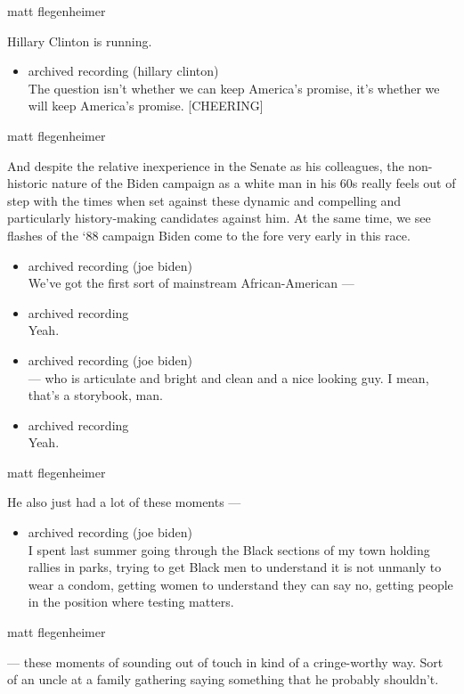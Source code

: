 matt flegenheimer

Hillary Clinton is running.

\begin{itemize}
\tightlist
\item
  archived recording (hillary clinton)\\
  The question isn't whether we can keep America's promise, it's whether
  we will keep America's promise. {[}CHEERING{]}
\end{itemize}

matt flegenheimer

And despite the relative inexperience in the Senate as his colleagues,
the non-historic nature of the Biden campaign as a white man in his 60s
really feels out of step with the times when set against these dynamic
and compelling and particularly history-making candidates against him.
At the same time, we see flashes of the `88 campaign Biden come to the
fore very early in this race.

\begin{itemize}
\item
  archived recording (joe biden)\\
  We've got the first sort of mainstream African-American ---
\item
  archived recording\\
  Yeah.
\item
  archived recording (joe biden)\\
  --- who is articulate and bright and clean and a nice looking guy. I
  mean, that's a storybook, man.
\item
  archived recording\\
  Yeah.
\end{itemize}

matt flegenheimer

He also just had a lot of these moments ---

\begin{itemize}
\tightlist
\item
  archived recording (joe biden)\\
  I spent last summer going through the Black sections of my town
  holding rallies in parks, trying to get Black men to understand it is
  not unmanly to wear a condom, getting women to understand they can say
  no, getting people in the position where testing matters.
\end{itemize}

matt flegenheimer

--- these moments of sounding out of touch in kind of a cringe-worthy
way. Sort of an uncle at a family gathering saying something that he
probably shouldn't.

